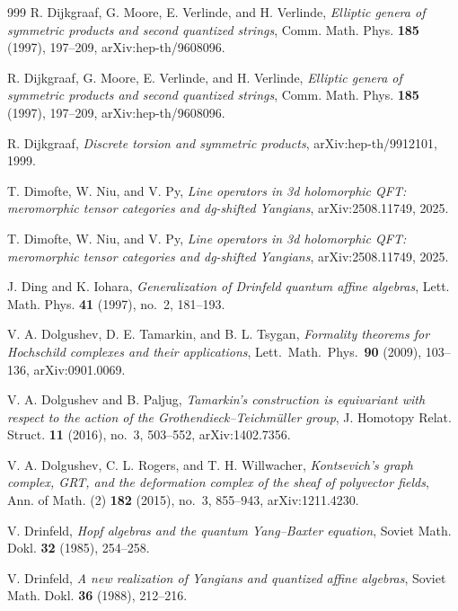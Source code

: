 \begin{thebibliography}{999}
R. Dijkgraaf, G. Moore, E. Verlinde, and H. Verlinde, \emph{Elliptic genera of symmetric products and second quantized strings}, Comm. Math. Phys. \textbf{185} (1997), 197--209, arXiv:hep-th/9608096.

R. Dijkgraaf, G. Moore, E. Verlinde, and H. Verlinde, \emph{Elliptic genera of symmetric products and second quantized strings}, Comm. Math. Phys. \textbf{185} (1997), 197--209, arXiv:hep-th/9608096.

R. Dijkgraaf, \emph{Discrete torsion and symmetric products}, arXiv:hep-th/9912101, 1999.

T. Dimofte, W. Niu, and V. Py, \emph{Line operators in 3d holomorphic QFT: meromorphic tensor categories and dg-shifted Yangians}, arXiv:2508.11749, 2025.

T. Dimofte, W. Niu, and V. Py, \emph{Line operators in 3d holomorphic QFT: meromorphic tensor categories and dg-shifted Yangians}, arXiv:2508.11749, 2025.

J. Ding and K. Iohara, \emph{Generalization of Drinfeld quantum affine algebras}, Lett. Math. Phys. \textbf{41} (1997), no.~2, 181--193.

V. A. Dolgushev, D. E. Tamarkin, and B. L. Tsygan, \emph{Formality theorems for Hochschild complexes and their applications}, Lett.\ Math.\ Phys.\ \textbf{90} (2009), 103--136, arXiv:0901.0069.

V. A. Dolgushev and B. Paljug, \emph{Tamarkin's construction is equivariant with respect to the action of the Grothendieck--Teichm\"uller group}, J. Homotopy Relat. Struct. \textbf{11} (2016), no.~3, 503--552, arXiv:1402.7356.

V. A. Dolgushev, C. L. Rogers, and T. H. Willwacher, \emph{Kontsevich's graph complex, GRT, and the deformation complex of the sheaf of polyvector fields}, Ann. of Math. (2) \textbf{182} (2015), no.~3, 855--943, arXiv:1211.4230.

V. Drinfeld, \emph{Hopf algebras and the quantum Yang--Baxter equation}, Soviet Math. Dokl. \textbf{32} (1985), 254--258.

V. Drinfeld, \emph{A new realization of Yangians and quantized affine algebras}, Soviet Math. Dokl. \textbf{36} (1988), 212--216.


\end{thebibliography}
